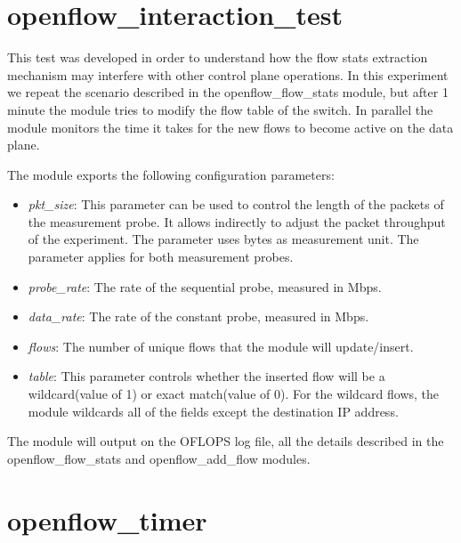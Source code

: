 \documentclass{book}
\begin{document}
  \section{openflow\_interaction\_test}

  This test was developed in order to understand how the flow stats extraction
  mechanism may interfere with other control plane operations. In this experiment
  we repeat the scenario described in the openflow\_flow\_stats module, but
  after 1 minute the module tries to modify the flow table of the switch. In
  parallel the module monitors the time it takes for the new flows to become
  active on the data plane. 

  The module exports the following configuration parameters:
  \begin{itemize}
  \item \emph{pkt\_size}: This parameter can be used to control the length of the
  packets of the measurement probe. It allows indirectly to adjust the packet
  throughput of the experiment. The parameter uses bytes as measurement unit.
  The parameter applies for both measurement probes.
  \item \emph{probe\_rate}: The rate of the sequential probe, measured in
  Mbps.
  \item \emph{data\_rate}: The rate of the constant probe, measured in Mbps.
  \item \emph{flows}:  The number of unique flows that the module will
  update/insert.
  \item \emph{table}:  This parameter controls whether the inserted flow will
  be
  a wildcard(value of 1) or exact match(value of 0). For the wildcard 
  flows, the module wildcards all of the fields except the destination IP address.
  \end{itemize}

  The module will output on the OFLOPS log file, all the details described in the
  openflow\_flow\_stats and openflow\_add\_flow modules. 

  \section{openflow\_timer}
\end{document}
